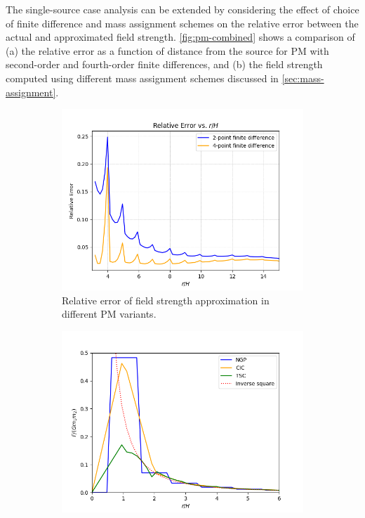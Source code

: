 The single-source case analysis can be extended by considering the effect of choice of finite difference and mass assignment schemes on the relative error between the actual and approximated field strength.
\autoref{fig:pm-combined} shows a comparison of (a) the relative error as a function of distance from the source for PM with second-order and fourth-order finite differences, and (b) the field strength computed using different mass assignment schemes discussed in \autoref{sec:mass-assignment}.
\begin{figure}[htp]
    \centering
    \begin{subfigure}[t]{0.48\textwidth}
        \centering
        \includegraphics[width=\linewidth]{chapters/pm-method/img/pm-finite-diff-err.png}
        \caption{Relative error of field strength approximation in different PM variants.}
        \label{fig:pm-finite-diff-err}
    \end{subfigure}
    \hfill
    \begin{subfigure}[t]{0.48\textwidth}
        \centering
        \includegraphics[width=\linewidth]{chapters/pm-method/img/pm-mass-assignment.png}

\end{subfigure}
\end{figure}
